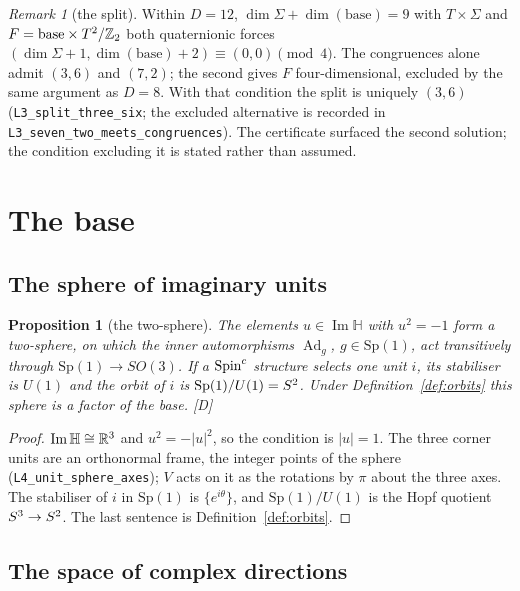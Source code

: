 \documentclass[11pt,a4paper]{article}
\theoremstyle{plain}
\newtheorem{proposition}[theorem]{Proposition}
\theoremstyle{definition}
\theoremstyle{remark}
\newtheorem{remark}[theorem]{Remark}
\newcommand{\Hquat}{\mathbb{H}}
\newcommand{\ImH}{\operatorname{Im}\Hquat}
\newcommand{\Ad}{\operatorname{Ad}}
\newcommand{\rigD}{[\textup{D}]}
\begin{document}
\begin{remark}[the split]\label{rem:split}
Within $D=12$, $\dim\Sigma+\dim(\text{base})=9$ with $T\times\Sigma$ and $F=\text{base}\times T^2/\mathbb{Z}_2$ both quaternionic forces $(\dim\Sigma+1,\dim(\text{base})+2)\equiv(0,0)\pmod 4$. The congruences alone admit $(3,6)$ and $(7,2)$; the second gives $F$ four-dimensional, excluded by the same argument as $D=8$. With that condition the split is uniquely $(3,6)$ (\texttt{L3\_split\_three\_six}; the excluded alternative is recorded in \texttt{L3\_seven\_two\_meets\_congruences}). The certificate surfaced the second solution; the condition excluding it is stated rather than assumed.
\end{remark}

\section{The base}\label{sec:base}

\subsection{The sphere of imaginary units}

\begin{proposition}[the two-sphere]\label{prop:S2}
The elements $u\in\ImH$ with $u^{2}=-1$ form a two-sphere, on which the inner automorphisms $\Ad_{g}$, $g\in\mathrm{Sp}(1)$, act transitively through $\mathrm{Sp}(1)\to SO(3)$. If a $\text{Spin}^c$ structure selects one unit $i$, its stabiliser is $U(1)$ and the orbit of $i$ is $\mathrm{Sp}(1)/U(1)=S^2$. Under Definition~\ref{def:orbits} this sphere is a factor of the base. \rigD
\end{proposition}

\begin{proof}
$\ImH\cong\R^{3}$ and $u^{2}=-\lvert u\rvert^{2}$, so the condition is $\lvert u\rvert=1$. The three corner units are an orthonormal frame, the integer points of the sphere (\texttt{L4\_unit\_sphere\_axes}); $V$ acts on it as the rotations by $\pi$ about the three axes. The stabiliser of $i$ in $\mathrm{Sp}(1)$ is $\{e^{i\theta}\}$, and $\mathrm{Sp}(1)/U(1)$ is the Hopf quotient $S^{3}\to S^2$. The last sentence is Definition~\ref{def:orbits}.
\end{proof}

\subsection{The space of complex directions}
\end{document}
